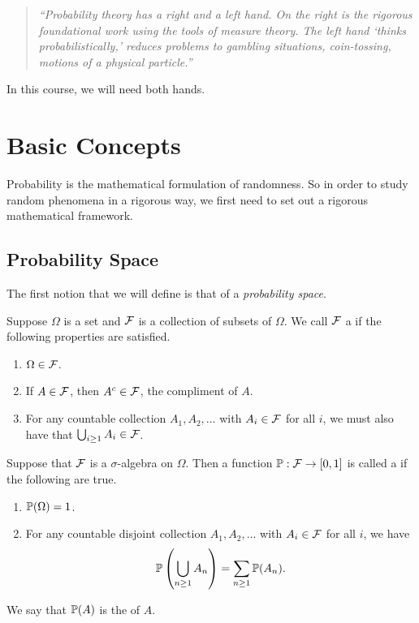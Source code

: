\documentclass[a4paper]{scrreprt}
\begin{document}
\begin{quote}
	\emph{``Probability theory has a right and a left hand. On the right is the rigorous foundational work using the tools of measure theory. The left hand `thinks probabilistically,' reduces problems to gambling situations, coin-tossing, motions of a physical particle.''}
\end{quote}

In this course, we will need both hands.


\chapter{Basic Concepts}

Probability is the mathematical formulation of randomness. So in order to study random phenomena in a rigorous way, we first need to set out a rigorous mathematical framework. 

\section{Probability Space}

The first notion that we will define is that of a \emph{probability space}.

\begin{definition}
Suppose $\Omega$ is a set and $\mathcal{F}$ is a collection of subsets of $\Omega$. We call $\mathcal{F}$ a  if the following properties are satisfied.
\begin{enumerate}[label=(\roman*)]
	\item $\Omega \in \mathcal{F}$.
	\item If $A \in \mathcal{F}$, then $A^c \in \mathcal{F}$, the compliment of $A$.
	\item For any countable collection $A_1, A_2, \dots$ with $A_i \in \mathcal{F}$ for all $i$, we must also have that $\bigcup_{i \geq 1} A_i \in \mathcal{F}$.
\end{enumerate}
\end{definition}

\begin{definition}
	Suppose that $\mathcal{F}$ is a $\sigma$-algebra on $\Omega$. Then a function $\mathbb{P} : \mathcal{F} \rightarrow [0, 1]$	is called a  if the following are true.
	\begin{enumerate}[label=(\roman*)]
		\item $\mathbb{P}(\Omega) = 1$.
		\item For any countable disjoint collection $A_1, A_2, \dots$ with $A_i \in \mathcal{F}$ for all $i$, we have
		$$
		\mathbb{P}\left(\bigcup_{n \geq 1} A_n\right) = \sum_{n \geq 1} \mathbb{P} (A_n).
		$$
	\end{enumerate}
	We say that $\mathbb{P}(A)$ is the  of $A$.
\end{definition}
\end{document}
